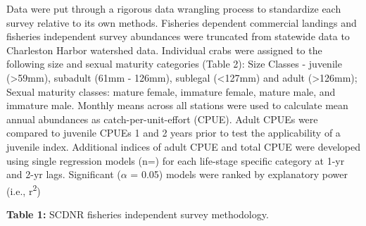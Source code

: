 \documentclass[
]{article}
\begin{document}
Data were put through a rigorous data wrangling process to standardize
each survey relative to its own methods. Fisheries dependent commercial
landings and fisheries independent survey abundances were truncated from
statewide data to Charleston Harbor watershed data. Individual crabs
were assigned to the following size and sexual maturity categories
(Table 2): Size Classes - juvenile (\textgreater59mm), subadult (61mm -
126mm), sublegal (\textless127mm) and adult (\textgreater126mm); Sexual
maturity classes: mature female, immature female, mature male, and
immature male. Monthly means across all stations were used to calculate
mean annual abundances as catch-per-unit-effort (CPUE). Adult CPUEs were
compared to juvenile CPUEs 1 and 2 years prior to test the applicability
of a juvenile index. Additional indices of adult CPUE and total CPUE
were developed using single regression models (n=) for each life-stage
specific category at 1-yr and 2-yr lags. Significant (\(\alpha\) = 0.05)
models were ranked by explanatory power (i.e., r\textsuperscript{2})

\newpage

\textbf{Table 1:} SCDNR fisheries independent survey methodology.\\
\end{document}
